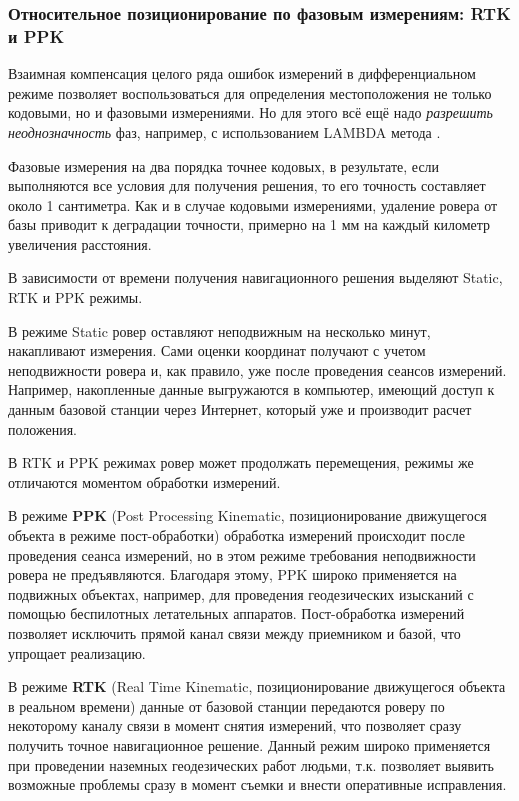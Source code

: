 \subsubsection{Относительное позиционирование по фазовым измерениям: RTK и PPK}

Взаимная компенсация целого ряда ошибок измерений в дифференциальном режиме позволяет воспользоваться для определения местоположения не только кодовыми, но и фазовыми измерениями. 
Но для этого всё ещё надо \textit{разрешить неоднозначность} фаз, например, с использованием LAMBDA метода \cite{teunissen1993}.

Фазовые измерения на два порядка точнее кодовых, в результате, если выполняются все условия для получения решения, то его точность составляет около 1 сантиметра.
Как и в случае кодовыми измерениями, удаление ровера от базы приводит к деградации точности, примерно на 1 мм на каждый километр увеличения расстояния. 

В зависимости от времени получения навигационного решения выделяют Static, RTK и PPK режимы. 

В режиме Static ровер оставляют неподвижным на несколько минут, накапливают измерения. 
Сами оценки координат получают с учетом неподвижности ровера и, как правило, уже после проведения сеансов измерений. 
Например, накопленные данные выгружаются в компьютер, имеющий доступ к данным базовой станции через Интернет, который уже и производит расчет положения. 

В RTK и PPK режимах ровер может продолжать перемещения, режимы же отличаются моментом обработки измерений. 


В режиме \textbf{PPK} (Post Processing Kinematic, позиционирование движущегося объекта в режиме пост-обработки) обработка измерений происходит после проведения сеанса измерений, но в этом режиме требования неподвижности ровера не предъявляются. 
Благодаря этому, PPK широко применяется на подвижных объектах, например, для проведения геодезических изысканий с помощью беспилотных летательных аппаратов.
Пост-обработка измерений позволяет исключить прямой канал связи между приемником и базой, что упрощает реализацию. 

В режиме \textbf{RTK} (Real Time Kinematic, позиционирование движущегося объекта в реальном времени) данные от базовой станции передаются роверу по некоторому каналу связи в момент снятия измерений, что позволяет сразу получить точное навигационное решение.
Данный режим широко применяется при проведении наземных геодезических работ людьми, т.к. позволяет выявить возможные проблемы сразу в момент съемки и внести оперативные исправления. 

